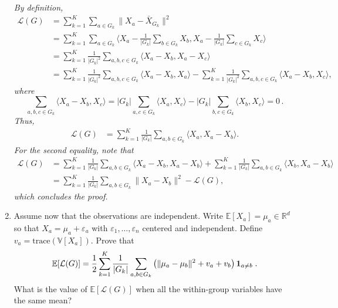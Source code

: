 \documentclass[a4paper,10pt,fleqn]{article}
\newcommand{\eqsp}{\,}
\newcommand{\R}{\ensuremath{\mathbb{R}}}
\newcommand{\E}{\ensuremath{\mathbb{E}}}
\newcommand{\V}{\ensuremath{\mathbb{V}}}
\newcommand{\1}{\ensuremath{\mathbbm{1}}}
\newcommand{\eps}{\varepsilon}
\newcommand{\crit}{\mathcal{L}}
\begin{document}
\begin{enumerate}
{\em
By definition,
\begin{align*}
\crit(G) & = \sum_{k=1}^K\sum_{a\in G_{k}}\|X_{a}-\bar{X}_{G_{k}}\|^2 \\
& = \sum_{k=1}^K \sum_{a\in G_{k}} \langle X_a - \frac{1}{|G_k|} \sum_{b \in G_k} X_b,X_a - \frac{1}{|G_k|} \sum_{c \in G_k} X_c \rangle \\
& = \sum_{k=1}^K \frac{1}{|G_k|^2}\sum_{a, b, c\in G_{k}} \langle X_a - X_b,X_a - X_c \rangle \\
& = \sum_{k=1}^K \frac{1}{|G_k|^2}\sum_{a, b, c\in G_{k}} \langle X_a - X_b,X_a \rangle 
- \sum_{k=1}^K \frac{1}{|G_k|^2}\sum_{a, b, c\in G_{k}} \langle X_a - X_b,X_c \rangle,
\end{align*}
where
$$
\sum_{a, b, c\in G_{k}} \langle X_a - X_b,X_c \rangle  = |G_k| \sum_{a, c\in G_{k}} \langle X_a ,X_c \rangle - |G_k| \sum_{b, c\in G_{k}} \langle X_b ,X_c \rangle = 0\eqsp.
$$
Thus, 
\begin{align*}
\crit(G) & = \sum_{k=1}^K \frac{1}{|G_k|}\sum_{a, b\in G_{k}} \langle X_a,X_a -X_b \rangle.
\end{align*}
For the second equality, note that 
\begin{align*}
\crit(G) & = \sum_{k=1}^K \frac{1}{|G_k|}\sum_{a, b\in G_{k}} \langle X_a-X_b,X_a -X_b \rangle + \sum_{k=1}^K \frac{1}{|G_k|}\sum_{a, b\in G_{k}} \langle X_b,X_a -X_b \rangle\\
& = \sum_{k=1}^K \frac{1}{|G_k|}\sum_{a, b\in G_{k}} \| X_a-X_b \|^2 - \crit(G),
\end{align*}
which concludes the proof. 
}
\item Assume now that the observations are independent. Write $\E[X_a] = \mu_{a}\in\R^d$ so that $X_{a}=\mu_{a}+\eps_{a}$ with $\eps_{1},\ldots,\eps_{n}$ centered and independent. Define $v_{a}=\textrm{trace}(\V[X_{a}])$. Prove that
$$
\E[\crit(G)]={1\over 2}\sum_{k=1}^K{1\over |G_{k}|}\sum_{a,b\in G_{k}} \left(\|\mu_{a}-\mu_{b}\|^2+v_{a}+v_{b}\right){\bf 1}_{a\neq b}\;.
$$
What is the value of $\E[\crit(G)]$ when all the within-group variables have the same mean?

\vspace{.2cm}

{\em

}
\end{enumerate}
\end{document}
